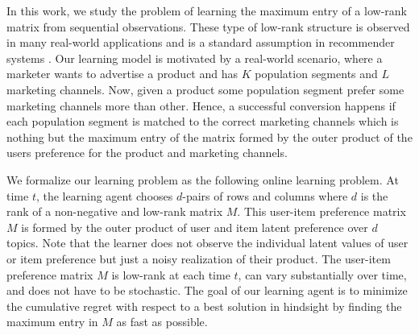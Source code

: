 In this work, we study the problem of learning the maximum entry of a low-rank matrix from sequential observations. These type of low-rank structure is observed in many real-world applications and is a standard assumption in recommender systems \citep{koren2009matrix,ricci2011liorrokach}. Our learning model is motivated by a real-world scenario, where a marketer wants to advertise a product and has $K$ population segments and $L$ marketing channels. Now, given a product some population segment prefer some marketing channels more than other. Hence, a successful conversion happens if each population segment is matched to the correct marketing channels which is nothing but the maximum entry of the matrix formed by the outer product of the users preference for the product and marketing channels.  

We formalize our learning problem as the following online learning problem. At time $t$, the learning agent chooses $d$-pairs of rows and columns where $d$ is the rank of a non-negative and low-rank matrix $M$. This user-item preference matrix $M$ is formed by the outer product of user and item latent preference over $d$ topics. Note that the learner does not observe the individual latent values of user or item preference but just a noisy realization of their product. The user-item preference matrix $M$ is low-rank at each time $t$, can vary substantially over time, and does not have to be stochastic. The goal of our learning agent is to minimize the cumulative regret with respect to a best solution in hindsight by finding the maximum entry in $M$ as fast as possible.



